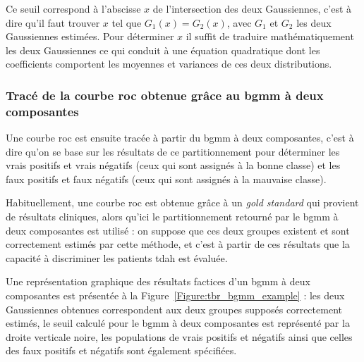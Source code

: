Ce seuil correspond à l'abscisse $x$ de l'intersection des deux Gaussiennes, c'est à dire qu'il faut trouver $x$ tel que $G_1(x) = G_2(x)$, avec $G_1$ et $G_2$ les deux Gaussiennes estimées. 
Pour déterminer $x$ il suffit de traduire mathématiquement les deux Gaussiennes ce qui
conduit à une équation quadratique dont les coefficients comportent les moyennes et variances de ces deux distributions.

\subsubsection{Tracé de la courbe \gls{roc} obtenue grâce au \gls{bgmm} à deux composantes}
Une courbe \gls{roc} est ensuite tracée à partir du \gls{bgmm} à deux composantes, c'est à dire qu'on se base sur les résultats de ce partitionnement pour déterminer les 
vrais positifs et vrais négatifs (ceux qui sont assignés à la bonne classe) et les faux positifs et faux négatifs (ceux qui sont assignés à la mauvaise classe). 

Habituellement, une courbe \gls{roc}
est obtenue grâce à un \textit{gold standard} qui provient de résultats cliniques, alors qu'ici le partitionnement retourné par le \gls{bgmm} à deux composantes est utilisé : on suppose 
que ces deux groupes existent et sont correctement estimés par cette méthode, et c'est à partir de ces résultats que la capacité à discriminer les patients \gls{tdah} est évaluée.

Une représentation graphique des résultats factices d'un \gls{bgmm} à deux composantes est présentée à la Figure~\ref{Figure:tbr_bgmm_example} : les deux Gaussiennes obtenues correspondent 
aux deux groupes supposés correctement estimés,
le seuil calculé pour le \gls{bgmm} à deux composantes est représenté par la droite verticale noire, les populations de vrais positifs et négatifs ainsi que celles des faux positifs 
et négatifs sont également spécifiées. 


